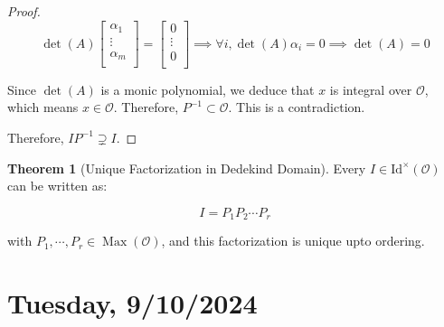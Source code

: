 \documentclass[openany]{amsbook}
\numberwithin{section}{chapter}
\theoremstyle{definition}
\newtheorem{theorem}{Theorem}[chapter]
\begin{document}
\begin{proof}
    \[
        \det (A) \begin{bmatrix}
             \alpha_1 \\
             \vdots \\
             \alpha_m \\
        \end{bmatrix} = \begin{bmatrix}
             0 \\
             \vdots \\
             0 \\
        \end{bmatrix} \implies \forall i, \det(A) \alpha_i = 0 \implies \det (A) = 0
    \]

    Since \(\det (A)\) is a monic polynomial, we deduce that \(x\) is integral over \(\mathcal{O}\), which means \(x\in \mathcal{O}\). Therefore, \(P ^{-1} \subset \mathcal{O}\). This is a contradiction.

    Therefore, \(I P ^{-1} \supsetneq I\).
\end{proof}

\begin{theorem}[Unique Factorization in Dedekind Domain]
    Every \(I \in \operatorname{Id^\times}(\mathcal{O}) \) can be written as:

    \[
        I = P_1 P_2 \cdots P_r
    \]

    with \(P_1, \cdots , P_r \in \operatorname{Max}(\mathcal{O})\), and this factorization is unique upto ordering. 
\end{theorem}

\section*{Tuesday, 9/10/2024}
\end{document}
